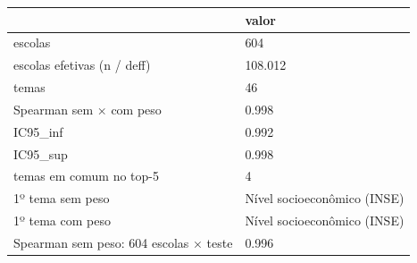 \begin{tabular}{ll}
\toprule
 & valor \\
\midrule
escolas & 604 \\
escolas efetivas (n / deff) & 108.012 \\
temas & 46 \\
Spearman sem × com peso & 0.998 \\
IC95\_inf & 0.992 \\
IC95\_sup & 0.998 \\
temas em comum no top-5 & 4 \\
1º tema sem peso & Nível socioeconômico (INSE) \\
1º tema com peso & Nível socioeconômico (INSE) \\
Spearman sem peso: 604 escolas × teste & 0.996 \\
\bottomrule
\end{tabular}
